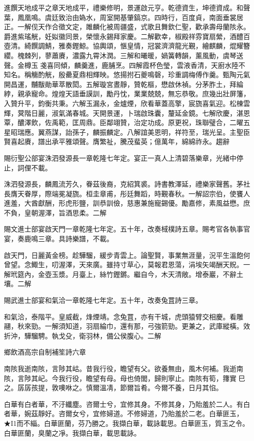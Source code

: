 \begin{pinyinscope}
進饌天地成平之章天地成平，禮樂修明，景運啟元亨。乾德資生，坤德資成。和聲葉，鳳凰鳴。虞廷致治由媯水，周室開基肇鎬京。四時行，百度貞，南面垂裳居正。一解伣天作合徵文定，雎麟化被周疆盛，式歌且舞欽仁聖，歡承壽母蘭陔永。爵進紫瑤觥，妊姒徽同景，榮懷永錫拜家慶。二解歡幸，椒殿祥雰寶扇縈，酒醴百壺清。綺饌調鯖，雅奏鏗鯨。協輿頌，愜皇情，冠裳濟濟龍光覲，繪麒麟，焜耀簪纓。槐棘列，蓼蕭賡，濃露九霄沐潤。三解和曦暖，媧簧轉韻，薰風動，虞琴送聲。金樽玉戔喜同傾，麟羹進，鹿脯烹。四解霞杯色瑩，雲液香清，天廚水陸不知名。稱觴酌觥，殷罍夏鼎相輝映。悠揚拊石夔鳴磬，珍重調梅傅作羹。甄陶元氣開昌運，黼黻勛華萃散閎。五解璇宮晝靜，贊乾樞，懋啟休禎。分茅胙土，拜綸綍，親承寵命。煌煌天語垂謨訓，勵丹忱，業業兢兢，無忘恭敬。庶幾出壯屏籓，入贊升平，鈞衡共秉。六解玉漏永，金爐煙，欣看華蓋高擎，宸旒喜氣迎。松棟雲輝，蓂階日麗，淑氣滿春城。天開景運，卜瑞啟珠囊，釐延金鏡。七解欣慶，湛恩覃，醲澤飲，佐禹範，匡周鼎。臣鄰翊贊，治定功成。原更祝，珠聯璧合，二曜五星昭瑞應。翼燕謀，詒孫子，麟振麟定。八解誼美恩明，祥符至，瑞光呈。主聖臣賢喜起賡，譜出承平雅頌聲。膺繁祉，騰茂蜚英；億萬年，綿綿祚永。趨辭

賜衍聖公部宴洙泗發源長一章乾隆七年定。宴正一真人上清碧落樂章，光緒中停止，詞俚不載。

洙泗發源長，麟鳳流芳久，眷茲後裔，克紹箕裘。詩書教澤延，禮樂家聲舊。茅社長膺天眷厚，際端冕凝旒。桓圭章甫，彤廷舞蹈，時覲春秋。一解詔宗伯，使饔人進羞，大酋獻酬，形虎形鹽，訓恭訓儉，慈惠兼施寵錫優。勵嘉修，素風益懋。庶不負，皇朝渥澤，旨酒思柔。二解

賜文進士部宴啟天門一章乾隆七年定。五十年，改奏棫樸詩五章。賜考官各執事官宴，奏鹿鳴三章。具詩樂譜，不載。

啟天門，日麗黃金榜。趁驊騮，緩步青雲上。論聖賢，事業無涯量，況平生溫飽何曾望。念鯫生，叨渥澤，天來廣。雖持寸草心，莫報君恩蕩，涓埃矢竭酬天貺。一解玳筵內，金壺玉漿。月臺上，絲竹鏗鏘。繼自今，木天清敞。增泰巖，不辭土壤。二解

賜武進士部宴和氣洽一章乾隆七年定。五十年，改奏兔罝詩三章。

和氣洽，泰階平。皇威截，烽煙靖。念兔罝，亦有干城，虎頭猿臂交相慶。看雕翮，秋來勁。一解須知道，羽扇綸巾，還有那，弓強箭勁。更兼之，武庫縱橫。效折沖，驊騮騁。執戈殳，衛羽林，備公侯腹心。二解

鄉飲酒高宗自制補笙詩六章

南陔我逝南陔，言陟其岵。昔我行役，瞻望有父。欲養無由，風木何補。我逝南陔，言陟其屺。今我行役，瞻望有母。母也倚閭，歸則寧止。南陔有筍，籜實巳之。孱孱孩提，敦噢咻之。慎爾溫凊，節爾旨肴。今爾不養，日月其惂。

白華有白者華，不汙纖塵。咨爾士兮，宜修其身。不修其身，乃貽羞於二人。有白者華，婉茲靜好。咨爾女兮，宜修婦道。不修婦道，乃貽羞於二老。白華匪玉，★I1而不緇。白華匪蘭，芬乃勝之。我擷白華，載詠載思。白華匪玉，質玉之令。白華匪蘭，臭蘭之凈。我擷白華，載思載詠。


\end{pinyinscope}
